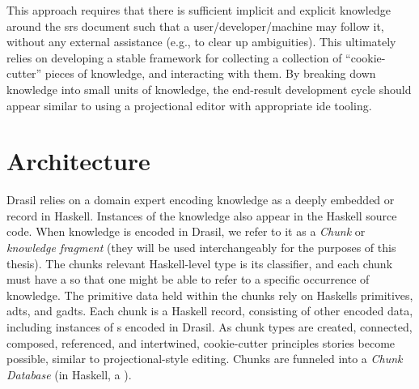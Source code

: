 This approach requires that there is sufficient implicit and explicit knowledge
around the \acs{srs} document such that a user/developer/machine may follow it,
without any external assistance (e.g., to clear up ambiguities). This ultimately
relies on developing a stable framework for collecting a collection of
``cookie-cutter'' pieces of knowledge, and interacting with them. By breaking
down knowledge into small units of knowledge, the end-result development cycle
should appear similar to using a projectional editor with appropriate \acs{ide}
tooling.

\drasilLogoImg{}

\drasilPersonification

\section{Architecture}

Drasil relies on a domain expert encoding knowledge as a deeply embedded
 or record in Haskell. Instances of the knowledge also appear in the
Haskell source code. When knowledge is encoded in Drasil, we refer to it as a
\textit{Chunk} or \textit{knowledge fragment} (they will be used interchangeably
for the purposes of this thesis). The chunks relevant Haskell-level type is its
classifier, and each chunk must have a  so that one might be able to
refer to a specific occurrence of knowledge. The primitive data held within the
chunks rely on Haskells primitives, \acsp{adt}, and \acsp{gadt}. Each chunk is a
Haskell record, consisting of other encoded data, including instances of
s encoded in Drasil. As chunk types are created, connected, composed,
referenced, and intertwined, cookie-cutter principles stories become possible,
similar to projectional-style editing. Chunks are funneled into a \textit{Chunk
      Database} (in Haskell, a \ChunkDB{}).

\originalChunkDBHaskell{}

